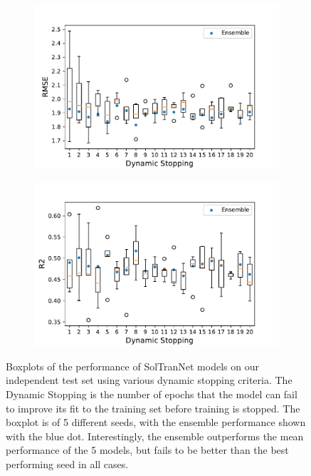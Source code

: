 \documentclass[journal=jcisd8,manuscript=article]{achemso}
\begin{document}
\begin{figure}[tb]
    \centering
    \begin{subfigure}[t]{0.48\textwidth}
        \centering
        \includegraphics[width=\linewidth]{figures/final_model_ind_dyn_RMSE.pdf}
    \end{subfigure}%
    \hfill
    \begin{subfigure}[t]{0.48\textwidth}
        \centering
        \includegraphics[width=\linewidth]{figures/final_model_ind_dyn_R2.pdf}
    \end{subfigure}
    \caption{Boxplots of the performance of SolTranNet models on our independent test set using various dynamic stopping criteria. The Dynamic Stopping is the number of epochs that the model can fail to improve its fit to the training set before training is stopped. The boxplot is of 5 different seeds, with the ensemble performance shown with the blue dot. Interestingly, the ensemble outperforms the mean performance of the 5 models, but fails to be better than the best performing seed in all cases.}
    \label{fig:dynsweep}
\end{figure}
\end{document}
